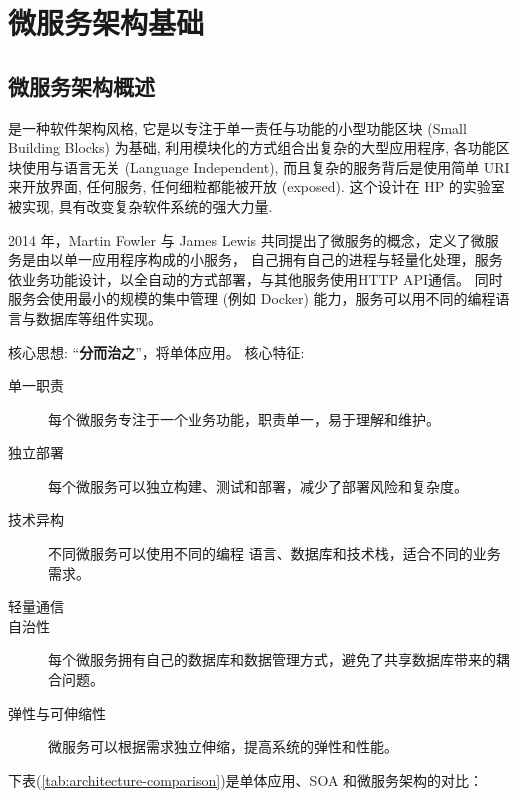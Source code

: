 \chapter{微服务架构基础}

\section{微服务架构概述}
 是一种软件架构风格, 它是以专注于单一责任与功能的小型功能区块 (Small Building Blocks) 为基础, 
利用模块化的方式组合出复杂的大型应用程序, 各功能区块使用与语言无关 (Language Independent), 
而且复杂的服务背后是使用简单 URI 来开放界面, 任何服务, 任何细粒都能被开放 (exposed). 
这个设计在 HP 的实验室被实现, 具有改变复杂软件系统的强大力量.

2014 年，Martin Fowler 与 James Lewis 共同提出了微服务的概念，定义了微服务是由以单一应用程序构成的小服务，
自己拥有自己的进程与轻量化处理，服务依业务功能设计，以全自动的方式部署，与其他服务使用HTTP API通信。
同时服务会使用最小的规模的集中管理 (例如 Docker) 能力，服务可以用不同的编程语言与数据库等组件实现。

核心思想: ``\textbf{分而治之}''，将单体应用。
核心特征: 
\begin{description}
    \item[单一职责] 每个微服务专注于一个业务功能，职责单一，易于理解和维护。
    \item[独立部署] 每个微服务可以独立构建、测试和部署，减少了部署风险和复杂度。
    \item[技术异构] 不同微服务可以使用不同的编程  语言、数据库和技术栈，适合不同的业务需求。
    \item[轻量通信] 
    \item[自治性] 每个微服务拥有自己的数据库和数据管理方式，避免了共享数据库带来的耦合问题。
    \item[弹性与可伸缩性] 微服务可以根据需求独立伸缩，提高系统的弹性和性能。
\end{description}

下表(\ref{tab:architecture-comparison})是单体应用、SOA 和微服务架构的对比：

